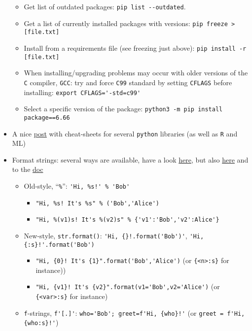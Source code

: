 \documentclass[a4paper,12pt,%
              final%
              ]{article}
\begin{document}
\begin{itemize}
\begin{itemize}
      \item Get list of outdated packages: \verb|pip list --outdated|.
      \item Get a list of currently installed packages with versions: \verb|pip freeze > [file.txt]|
      \item Install from a requirements file (see freezing just above): \verb|pip install -r [file.txt]|
      \item When installing/upgrading problems may occur with older versions of the \texttt{C} compiler, \texttt{GCC}: try and force \texttt{C99} standard by setting \texttt{CFLAGS} before installing: \verb|export CFLAGS='-std=c99'|
      \item Select a specific version of the package: \verb|python3 -m pip install package==6.66|
    \end{itemize}
  \item A nice \href{https://medium.com/@anushkhabajpai/top-data-science-cheat-sheets-ml-dl-python-r-sql-maths-statistics-5239d4568225}{post} with cheat-sheets for several \texttt{python} libraries (as well as \texttt{R} and ML)
  \item Format strings: several ways are available, have a look \href{https://realpython.com/python-string-formatting/}{here}, but also \href{https://pyformat.info/}{here} and to the \href{https://docs.python.org/3.10/library/string.html#format-string-syntax}{doc}
    \begin{itemize}
      \item Old-style, ``\verb|%|'': \verb|'Hi, %s!' % 'Bob'|
        \begin{itemize}
          \item \verb|"Hi, %s! It's %s" % ('Bob','Alice')|
          \item \verb|"Hi, %(v1)s! It's %(v2)s" % {'v1':'Bob','v2':Alice'}|
        \end{itemize}
      \item New-style, \verb|str.format()|: \verb|'Hi, {}!.format('Bob')'|, \verb|'Hi, {:s}!'.format('Bob')|
        \begin{itemize}
          \item \verb|"Hi, {0}! It's {1}".format('Bob','Alice')| (or \verb|{<n>:s}| for instance))
          \item \verb|"Hi, {v1}! It's {v2}".format(v1='Bob',v2='Alice')| (or \verb|{<var>:s}| for instance)
        \end{itemize}
      \item \texttt{f}-strings, \verb|f'[.]'|: \verb|who='Bob'; greet=f'Hi, {who}!'| (or \verb|greet = f'Hi, {who:s}!'|)

\end{itemize}
\end{itemize}
\end{document}

